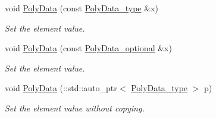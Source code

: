 \begin{DoxyCompactItemize}
void \hyperlink{classVTKFile__t_ab0a3f2aa2894d0384a89a6e5490c9372}{Poly\+Data} (const \hyperlink{classVTKFile__t_a4588b4f0e28ba09aa219bda7e1fc6c97}{Poly\+Data\+\_\+type} \&x)
\begin{DoxyCompactList}\small\item\em Set the element value. \end{DoxyCompactList}\item 
void \hyperlink{classVTKFile__t_a1c2a800d41431c04965c863220a3b1b5}{Poly\+Data} (const \hyperlink{classVTKFile__t_aacb796775ae228cd61726a23b809f3e4}{Poly\+Data\+\_\+optional} \&x)
\begin{DoxyCompactList}\small\item\em Set the element value. \end{DoxyCompactList}\item 
void \hyperlink{classVTKFile__t_a8ae292e04bf2c955d8f50cdeb60f9369}{Poly\+Data} (\+::std\+::auto\+\_\+ptr$<$ \hyperlink{classVTKFile__t_a4588b4f0e28ba09aa219bda7e1fc6c97}{Poly\+Data\+\_\+type} $>$ p)
\begin{DoxyCompactList}\small\item\em Set the element value without copying. \end{DoxyCompactList}\end{DoxyCompactItemize}
